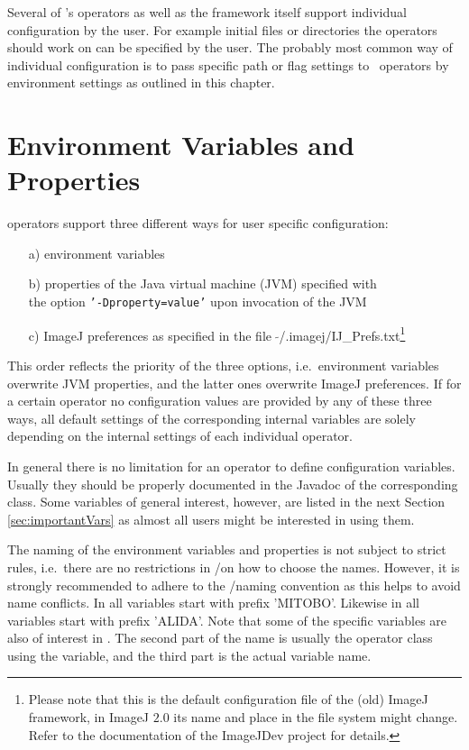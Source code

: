 Several of \mitobo's operators as well as the framework itself support individual configuration by the user. For example initial
files or directories the operators should work on can be specified by the user. The probably most common way of individual
configuration is to pass specific path or flag settings to \mitobo\ operators by environment settings as outlined in this chapter.

\section{Environment Variables and Properties}
\mitobo operators support three different ways for user specific configuration:
\begin{itemize}
    \item[a)] environment variables
    \item[b)] properties of the Java virtual machine (JVM) specified with\\
     the option \texttt{'-Dproperty=value'} upon invocation of the JVM
    \item[c)] ImageJ preferences as specified in the file $\;\tilde{ }$/.imagej/IJ\_Prefs.txt\footnote{Please note that this is the
    	default configuration file of the (old) ImageJ framework, in ImageJ $2.0$ its name and place in the file system might change. 
    	Refer to the documentation of the ImageJDev project for details.} 
\end{itemize}
This order reflects the priority of the three options, i.e.~environment variables overwrite JVM
properties, and the latter ones overwrite ImageJ preferences. If for a certain operator no configuration values are
provided by any of these three ways, all default settings of the corresponding internal variables are solely 
depending on the internal settings of each individual operator.

In general there is no limitation for an operator to define configuration variables. Usually they should be properly
documented in the Javadoc of the corresponding class. Some variables of general
interest, however, are listed in the next Section \ref{sec:importantVars} as almost all users might be interested in
using them. 

The naming of the environment variables and properties is not subject to strict rules, i.e.~there are no restrictions in  
\alida/\mitobo on how to choose the names. However, it is strongly
recommended to adhere to the \alida/\mitobo naming convention as this helps to avoid
name conflicts. In \mitobo all variables start with prefix 'MITOBO'. 
Likewise in \alida all variables start with prefix 'ALIDA'. Note that some of the \alida specific
variables are also of interest in \mitobo.
The second part of the name is usually the operator class using the variable, and the third part is the actual
variable name.

